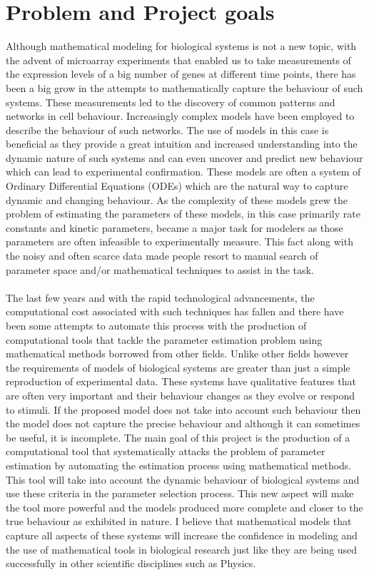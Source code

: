 \documentclass[12pt,a4paper,titlepage, fullpage]{article}
\begin{document}
\section{Problem and Project goals}
Although mathematical modeling for biological systems is not a new topic, with the advent of microarray experiments that enabled us to take measurements of the expression levels of a big number of genes at different time points, there has been a big grow in the attempts to mathematically capture the behaviour of such systems. These measurements led to the discovery of common patterns and networks in cell behaviour. Increasingly complex models have been employed to describe the behaviour of such networks.  The use of models in this case is beneficial as they provide a great intuition and increased understanding into the dynamic nature of such systems and can even uncover and predict new behaviour which can lead to experimental confirmation. These models are often a system of Ordinary Differential Equations (ODEs) which are the natural way to capture dynamic and changing behaviour. As the complexity of these models grew the problem of estimating the parameters of these models, in this case primarily rate constants and kinetic parameters, became a major task for modelers as those parameters are often infeasible to experimentally measure. This fact along with the noisy and often scarce data made people resort to manual search of parameter space and/or mathematical techniques to assist in the task. \\
\noindent
\\
The last few years and with the rapid technological advancements, the computational cost associated with such techniques has fallen and there have been some attempts to automate this process with the production of computational tools that tackle the parameter estimation problem using mathematical methods borrowed from other fields. Unlike other fields however the requirements of models of biological systems are greater than just a simple reproduction of experimental data. These systems have qualitative features that are often very important and their behaviour changes as they evolve or respond to stimuli. If the proposed model does not take into account such behaviour then the model does not capture the precise behaviour and although it can sometimes be useful,  it is incomplete. The main goal of this project is the production of a computational tool that systematically attacks the problem of parameter estimation by automating the estimation process using mathematical methods. This tool will take into account the dynamic behaviour of biological systems and use these criteria in the parameter selection process. This new aspect will make the tool more powerful and the models produced more complete and closer to the true behaviour as exhibited in nature. I believe that mathematical models that capture all aspects of these systems will increase the confidence in modeling and the use of mathematical tools in biological research just like they are being used successfully in other scientific disciplines such as Physics.
\end{document}
